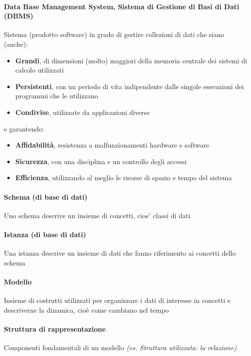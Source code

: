 \documentclass[12pt]{article}
\begin{document}
    \paragraph{Data Base Management System, Sistema di Gestione di Basi di Dati (DBMS)}
    Sistema (prodotto software) in grado di gestire collezioni di dati che siano (anche): 
    \begin{itemize}
        \item \textbf{Grandi}, di dimensioni (molto) maggiori della memoria centrale dei sistemi di calcolo utilizzati
        \item \textbf{Persistenti}, con un periodo di vita indipendente dalle singole esecuzioni dei programmi che le utilizzano
        \item \textbf{Condivise}, utilizzate da applicazioni diverse
    \end{itemize}
    e garantendo:
    \begin{itemize}
        \item \textbf{Affidabilità}, resistenza a malfunzionamenti hardware e software 
        \item \textbf{Sicurezza}, con una disciplina e un controllo degli accessi
        \item \textbf{Efficienza}, utilizzando al meglio le risorse di spazio e tempo del sistema
    \end{itemize}

    \paragraph{Schema (di base di dati)}
    Uno schema descrive un insieme di concetti, cioe’ classi di dati
    \paragraph{Istanza (di base di dati)}
    Una istanza descrive un insieme di dati che fanno riferimento ai concetti dello schema
    \paragraph{Modello}
    Insieme di costrutti utilizzati per organizzare i dati di interesse in concetti e descriverne la dinamica, cioè come cambiano nel tempo 
    \paragraph{Struttura di rappresentazione}
    Componenti fondamentali di un modello \textit{(es. Struttura utilizzata: la relazione)}
\end{document}
